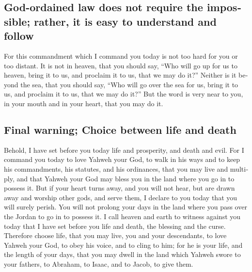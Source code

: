 \begin{paracol}{2}
\begin{otherlanguage}{english}
\hypertarget{god-ordained-law-does-not-require-the-impossible-rather-it-is-easy-to-understand-and-follow}{%
\subsection{God-ordained law does not require the impossible; rather, it
is easy to understand and
follow}\label{god-ordained-law-does-not-require-the-impossible-rather-it-is-easy-to-understand-and-follow}}

 For this commandment which I command you today is not
too hard for you or too distant.  It is not in heaven,
that you should say, ``Who will go up for us to heaven, bring it to us,
and proclaim it to us, that we may do it?''  Neither is
it beyond the sea, that you should say, ``Who will go over the sea for
us, bring it to us, and proclaim it to us, that we may do it?''
 But the word is very near to you, in your mouth and in
your heart, that you may do it.

\hypertarget{final-warning-choice-between-life-and-death}{%
\subsection{Final warning; Choice between life and
death}\label{final-warning-choice-between-life-and-death}}

 Behold, I have set before you today life and prosperity,
and death and evil.  For I command you today to love
Yahweh your God, to walk in his ways and to keep his commandments, his
statutes, and his ordinances, that you may live and multiply, and that
Yahweh your God may bless you in the land where you go in to possess it.
 But if your heart turns away, and you will not hear, but
are drawn away and worship other gods, and serve them,  I
declare to you today that you will surely perish. You will not prolong
your days in the land where you pass over the Jordan to go in to possess
it.  I call heaven and earth to witness against you today
that I have set before you life and death, the blessing and the curse.
Therefore choose life, that you may live, you and your descendants,
 to love Yahweh your God, to obey his voice, and to cling
to him; for he is your life, and the length of your days, that you may
dwell in the land which Yahweh swore to your fathers, to Abraham, to
Isaac, and to Jacob, to give them.

\end{otherlanguage}


\end{paracol}
